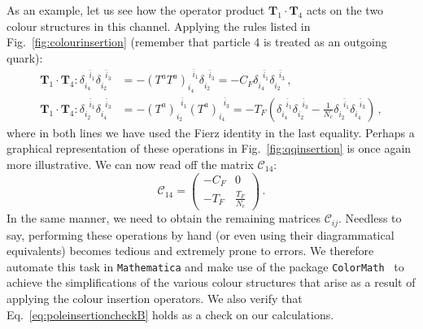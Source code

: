 \documentclass[main.tex]{subfiles}
\begin{document}
As an example, let us see how the operator product $\bm{T}_1 \cdot \bm{T}_4$ acts on the two colour structures in this channel. Applying the rules listed in Fig.~\ref{fig:colourinsertion} (remember that particle 4 is treated as an outgoing quark):
\begin{align}
    \bm{T}_1 \cdot \bm{T}_4 : \delta_{i_4}^{\;\;\bar{i}_1} \delta_{i_2}^{\;\;\bar{i}_3} &= -(T^a T^a)_{i_4}^{\;\;\bar{i}_1} \delta_{i_2}^{\;\;\bar{i}_3} = -C_F \delta_{i_4}^{\;\;\bar{i}_1} \delta_{i_2}^{\;\;\bar{i}_3}\,, \\
    \bm{T}_1 \cdot \bm{T}_4 : \delta_{i_2}^{\;\;\bar{i}_1} \delta_{i_4}^{\;\;\bar{i}_3} &= -(T^a)_{i_2}^{\;\;\bar{i}_1} (T^a)_{i_4}^{\;\;\bar{i}_3} = -T_F \left(\delta_{i_4}^{\;\;\bar{i}_1}\delta_{i_2}^{\;\;\bar{i}_3} - \frac{1}{N_c}\delta_{i_2}^{\;\;\bar{i}_1} \delta_{i_4}^{\;\;\bar{i}_3} \right) \,,
\end{align}
where in both lines we have used the Fierz identity in the last equality. Perhaps a graphical representation of these operations in Fig.~\ref{fig:qqinsertion} is once again more illustrative. We can now read off the matrix $\mathcal{C}_{14}$:
\begin{equation}
    \mathcal{C}_{14} = 
    \begin{pmatrix}
    -C_F & 0 \\
    -T_F & \frac{T_F}{N_c}
\end{pmatrix}\,.
\end{equation}
In the same manner, we need to obtain the remaining matrices $\mathcal{C}_{ij}$. Needless to say, performing these operations by hand (or even using their diagrammatical equivalents) becomes tedious and extremely prone to errors. We therefore automate this task in \texttt{Mathematica} and make use of the package \texttt{ColorMath}~\cite{Sjodahl:2012nk} to achieve the simplifications of the various colour structures that arise as a result of applying the colour insertion operators. We also verify that Eq.~\ref{eq:poleinsertioncheckB} holds as a check on our calculations.
\end{document}
